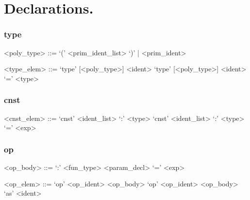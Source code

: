 \section{Declarations.}

\subsubsection*{type}
\begin{ecgrammar}
<poly_type> ::= `(' <prim_ident_list> `)' | <prim_ident>

<type_elem> ::=  `type' [<poly_type>] <ident> 
            \alt `type' [<poly_type>] <ident> `=' <type>
\end{ecgrammar}

\subsubsection*{cnst}
\begin{ecgrammar}
<cnst_elem> ::=  `cnst' <ident_list> `:' <type>
            \alt `cnst' <ident_list> `:' <type>  `=' <exp> 
\end{ecgrammar}

\subsubsection*{op}
\begin{ecgrammar}
<op_body> ::= `:' <fun_type> 
          \alt <param_decl> `=' <exp> 

<op_elem> ::= `op' <op_ident> <op_body> 
          \alt`op' <op_ident> <op_body> `as' <ident> 
\end{ecgrammar}

